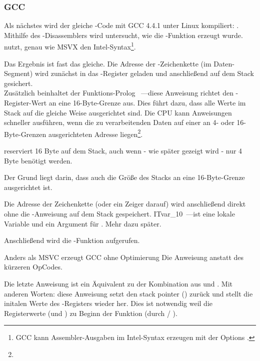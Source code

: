 \subsubsection{GCC}

Als nächstes wird der gleiche \CCpp-Code mit GCC 4.4.1 unter Linux kompiliert: .
Mithilfe des \IDA-Disassemblers wird untersucht, wie die \main-Funktion erzeugt wurde.
\IDA nutzt, genau wie MSVX den Intel-Syntax\footnote{GCC kann Assembler-Ausgaben im Intel-Syntax erzeugen mit der Options .}.



Das Ergebnis ist fast das gleiche.
Die Adresse der -Zeichenkette (im Daten-Segment) wird zunächst in das \EAX-Register geladen und anschließend auf dem Stack gesichert.\\
Zusätzlich beinhaltet der Funktions-Prolog ~---diese
Anweisung richtet den \ESP-Register-Wert an eine 16-Byte-Grenze aus.
Dies führt dazu, dass alle Werte im Stack auf die gleiche Weise ausgerichtet sind.
Die CPU kann Anweisungen schneller ausführen, wenn die zu verarbeitenden Daten auf einer an 4- oder 16-Byte-Grenzen ausgerichteten Adresse liegen\footnote{\URLWPDA}.

 reserviert 16 Byte auf dem Stack, auch wenn - wie später gezeigt wird - nur 4 Byte benötigt werden.

Der Grund liegt darin, dass auch die Größe des Stacks an eine 16-Byte-Grenze ausgerichtet ist.

Die Adresse der Zeichenkette (oder ein Zeiger darauf) wird anschließend direkt ohne die \PUSH-Anweisung auf dem Stack gespeichert.
IT{var\_10}~---ist eine lokale Variable und ein Argument für \printf{}.
Mehr dazu später.

Anschließend wird die \printf-Funktion aufgerufen.

Anders als MSVC erzeugt GCC ohne Optimierung Die Anweisung  anstatt des kürzeren OpCodes.

Die letzte Anweisung \LEAVE ist ein Äquivalent zu der Kombination aus  und .
Mit anderen Worten: diese Anweisung setzt den \gls{stack pointer} (\ESP) zurück und stellt die initalen Werte des \EBP-Registers wieder her.
Dies ist notwendig weil die Registerwerte (\ESP und \EBP) zu Beginn der Funktion (durch  / ).

